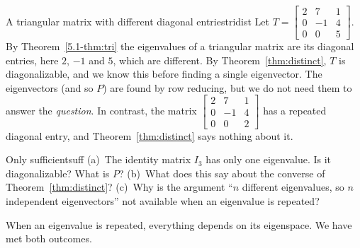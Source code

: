 \documentclass[11pt]{article}
\begin{document}
\begin{exmp}{A triangular matrix with different diagonal entries}{tridist}
Let $T=\begin{bmatrix}2&7&1\\0&-1&4\\0&0&5\end{bmatrix}$. By Theorem~\ref{5.1-thm:tri} the eigenvalues of a triangular matrix are its diagonal entries, here $2$, $-1$ and $5$, which are different. By Theorem~\ref{thm:distinct}, $T$ is diagonalizable, and we know this before finding a single eigenvector. The eigenvectors (and so $P$) are found by row reducing, but we do not need them to answer the \emph{question}. In contrast, the matrix $\begin{bmatrix}2&7&1\\0&-1&4\\0&0&2\end{bmatrix}$ has a repeated diagonal entry, and Theorem~\ref{thm:distinct} says nothing about it.
\end{exmp}

\begin{think}{Only sufficient}{suff}
(a)~The identity matrix $I_3$ has only one eigenvalue. Is it diagonalizable? What is $P$? (b)~What does this say about the converse of Theorem~\ref{thm:distinct}? (c)~Why is the argument ``$n$ different eigenvalues, so $n$ independent eigenvectors'' not available when an eigenvalue is repeated?
\end{think}

When an eigenvalue is repeated, everything depends on its eigenspace. We have met both outcomes.
\end{document}
